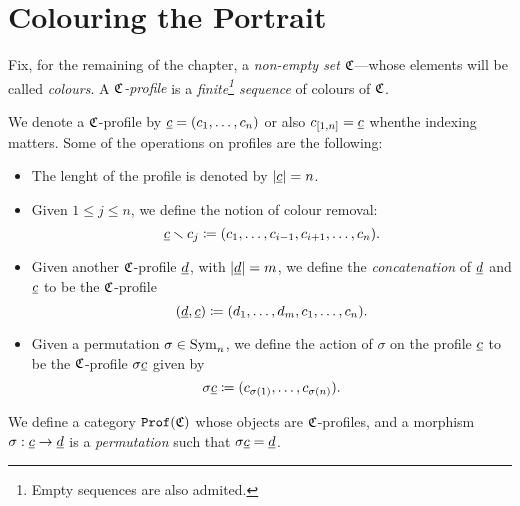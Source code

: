 \section{Colouring the Portrait}

\begin{definition}
\label{def:colors-profiles}
Fix, for the remaining of the chapter, a \emph{non-empty set} \(\mathfrak{C}\)---whose
elements will be called \emph{colours}. A \emph{\(\mathfrak{C}\)-profile} is a
\emph{finite\footnote{Empty sequences are also admited.} sequence} of colours of
\(\mathfrak{C}\).
\end{definition}

\begin{notation}
\label{not:profiles-and-operations}
We denote a \(\mathfrak{C}\)-profile by \(\underline{c} = (c_1, \dots, c_n)\) or also
\(c_{[1, n]} = \underline{c}\) whenthe indexing matters. Some of the operations on
profiles are the following:
\begin{itemize}\setlength\itemsep{0em}
\item The lenght of the profile is denoted by \(|\underline{c}| = n\).
\item Given \(1 \leq j \leq n\), we define the notion of colour removal:
  \[
  \underline{c} \smallsetminus c_j \coloneq (c_1, \dots, c_{i-1}, c_{i+1}, \dots, c_n).
  \]
\item Given another \(\mathfrak{C}\)-profile \(\underline{d}\), with \(|\underline{d}| = m\), we
  define the \emph{concatenation} of \(\underline{d}\) and \(\underline{c}\) to be the
  \(\mathfrak{C}\)-profile
  \[
  (\underline{d}, \underline{c}) \coloneq (d_1, \dots, d_m, c_1, \dots, c_n).
  \]
\item Given a permutation \(\sigma \in \operatorname{Sym}_n\), we define the action of
  \(\sigma\) on the profile \(\underline{c}\) to be the \(\mathfrak{C}\)-profile \(\sigma
  \underline{c}\) given by
  \[
  \sigma \underline{c} \coloneq (c_{\sigma(1)}, \dots, c_{\sigma(n)}).
  \]
\end{itemize}
\end{notation}

\begin{definition}
\label{def:profile-category}
We define a category \({\texttt{Prof}(\mathfrak{C})}\) whose objects are \(\mathfrak{C}\)-profiles, and a
morphism \(\sigma: \underline{c} \to \underline{d}\) is a \emph{permutation} such that
\(\sigma \underline{c} = \underline{d}\).
\end{definition}

